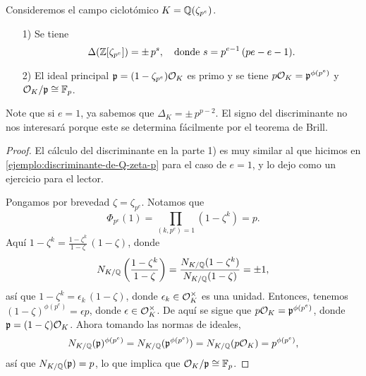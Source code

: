 \begin{lema}
  Consideremos el campo ciclotómico $K = \mathbb{Q} (\zeta_{p^e})$.

  \begin{enumerate}
  \item[1)] Se tiene
    \[ \Delta (\mathbb{Z} [\zeta_{p^e}]) = \pm\,p^s,
       \quad \text{donde } s = p^{e-1}\,(pe - e - 1). \]

  \item[2)] El ideal principal $\mathfrak{p} = (1 - \zeta_{p^e}) \mathcal{O}_K$ es primo
    y se tiene $p \mathcal{O}_K = \mathfrak{p}^{\phi (p^e)}$ y
    $\mathcal{O}_K/\mathfrak{p} \cong \mathbb{F}_p$.
  \end{enumerate}
\end{lema}

Note que si $e = 1$, ya sabemos que $\Delta_K = \pm\,p^{p-2}$. El signo del
discriminante no nos interesará porque este se determina fácilmente por
el teorema de Brill.

\begin{proof}
  El cálculo del discriminante en la parte 1) es muy similar al que hicimos en
  \ref{ejemplo:discriminante-de-Q-zeta-p} para el caso de $e = 1$, y lo dejo
  como un ejercicio para el lector.

  Pongamos por brevedad $\zeta = \zeta_{p^e}$. Notamos que
  $$\Phi_{p^e} (1) = \prod_{(k, p^e) = 1} (1 - \zeta^k) = p.$$
  Aquí $1 - \zeta^k = \frac{1 - \zeta^k}{1-\zeta}\,(1-\zeta)$, donde
  \[ N_{K/\mathbb{Q}} \left(\frac{1 - \zeta^k}{1-\zeta}\right) =
     \frac{N_{K/\mathbb{Q}} (1-\zeta^k)}{N_{K/\mathbb{Q}} (1-\zeta)} = \pm 1, \]
  así que $1 - \zeta^k = \epsilon_k \, (1 - \zeta)$, donde
  $\epsilon_k \in \mathcal{O}_K^\times$ es una unidad. Entonces, tenemos
  $(1 - \zeta)^{\phi (p^e)} = \epsilon p$, donde $\epsilon \in \mathcal{O}_K^\times$.
  De aquí se sigue que $p \mathcal{O}_K = \mathfrak{p}^{\phi (p^e)}$, donde
  $\mathfrak{p} = (1 - \zeta) \mathcal{O}_K$.
  Ahora tomando las normas de ideales,
  \[ N_{K/\mathbb{Q}} (\mathfrak{p})^{\phi (p^e)} =
     N_{K/\mathbb{Q}} (\mathfrak{p}^{\phi (p^e)}) =
     N_{K/\mathbb{Q}} (p \mathcal{O}_K) = p^{\phi (p^e)}, \]
  así que $N_{K/\mathbb{Q}} (\mathfrak{p}) = p$, lo que implica que
  $\mathcal{O}_K/\mathfrak{p} \cong \mathbb{F}_p$.
\end{proof}

